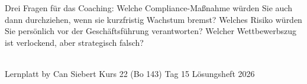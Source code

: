 \documentclass[11pt,a4paper,oneside]{article}
\begin{document}
\medskip
\begin{infobox}
Drei Fragen für das Coaching: Welche Compliance-Maßnahme würden Sie auch dann durchziehen, wenn sie kurzfristig Wachstum bremst? Welches Risiko würden Sie persönlich vor der Geschäftsführung verantworten? Welcher Wettbewerbszug ist verlockend, aber strategisch falsch?
\end{infobox}

\vspace{1cm}
\noindent{\color{lpAccent}\rule{\linewidth}{0.6pt}}\\[4pt]
{\footnotesize\sffamily\color{lpGray}Lernplatt \textperiodcentered{} by Can Siebert \textperiodcentered{} Kurs 22 (Bo 143) \textperiodcentered{} Tag 15 \textperiodcentered{} Lösungsheft \textperiodcentered{} \textcopyright{} 2026}
\end{document}
